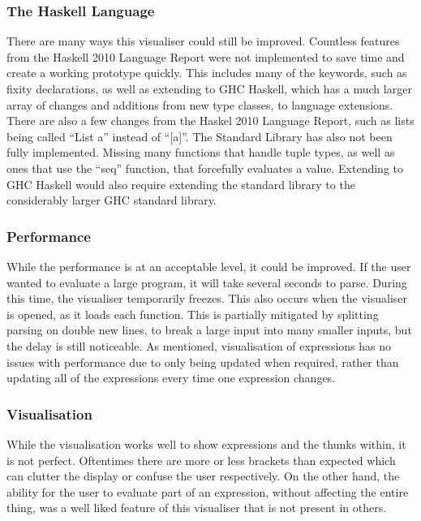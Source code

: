 \subsubsection{The Haskell Language}
There are many ways this visualiser could still be improved. Countless features from the Haskell 2010 Language Report \cite{haskell2010} were not implemented to save time and create a working prototype quickly. This includes many of the keywords, such as fixity declarations, as well as extending to GHC Haskell, which has a much larger array of changes and additions from new type classes, to language extensions. There are also a few changes from the Haskel 2010 Language Report, such as lists being called ``List a'' instead of ``[a]''.
The Standard Library has also not been fully implemented. Missing many functions that handle tuple types, as well as ones that use the ``seq'' function, that forcefully evaluates a value. Extending to GHC Haskell would also require extending the standard library to the considerably larger GHC standard library.
\subsubsection{Performance}
While the performance is at an acceptable level, it could be improved. If the user wanted to evaluate a large program, it will take several seconds to parse. During this time, the visualiser temporarily freezes. This also occurs when the visualiser is opened, as it loads each function. This is partially mitigated by splitting parsing on double new lines, to break a large input into many smaller inputs, but the delay is still noticeable.
As mentioned, visualisation of expressions has no issues with performance due to only being updated when required, rather than updating all of the expressions every time one expression changes.
\subsubsection{Visualisation}
While the visualisation works well to show expressions and the thunks within, it is not perfect. Oftentimes there are more or less brackets than expected which can clutter the display or confuse the user respectively. On the other hand, the ability for the user to evaluate part of an expression, without affecting the entire thing, was a well liked feature of this visualiser that is not present in others.